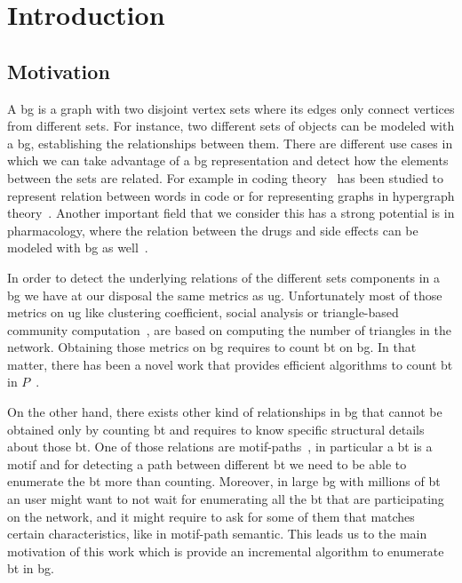 \chapter{Introduction}\label{chapter:1}
\section{Motivation}
A \acrfull{bg} is a graph with two disjoint vertex sets where its edges only connect vertices from different sets. 
For instance, two different sets of objects can be modeled with a \acrshort{bg}, establishing the relationships between them.
There are different use cases in which we can take advantage of a \acrshort{bg} representation and detect how the elements between the sets
are related. For example in coding theory~\cite{DBLP:journals/corr/WangL13} has been studied to represent relation between words in code 
or for representing graphs in hypergraph theory~\cite{hypergraph}. Another important field that we consider this has a strong potential is 
in pharmacology, where the relation between the drugs and side effects can be modeled with \acrshort{bg} as well~\cite{drugs}.

In order to detect the underlying relations of the different sets components in a \acrshort{bg} we have at our disposal the same metrics as \acrfull{ug}.
Unfortunately most of those metrics on \acrshort{ug} like clustering coefficient, social analysis or triangle-based community computation~\cite{ccoef,detect_graph,Newman_2003},
are based on computing the number of triangles in the network. Obtaining those metrics on \acrshort{bg} requires to count \acrfull{bt} on \acrshort{bg}.
In that matter, there has been a novel work that provides efficient algorithms to count \acrshort{bt} in $P$~\cite{btcount}.

On the other hand, there exists other kind of relationships in \acrshort{bg} that cannot be obtained only by counting \acrshort{bt} and requires to know specific
structural details about those \acrshort{bt}. One of those relations are motif-paths~\cite{Li2019MotifPA}, in particular a \acrshort{bt} is a motif and for detecting
a path between different \acrshort{bt} we need to be able to enumerate the \acrshort{bt} more than counting.
Moreover, in large \acrshort{bg} with millions of \acrshort{bt} an user might want to not wait for enumerating all the \acrshort{bt} that are participating on the network,
and it might require to ask for some of them that matches certain characteristics, like in motif-path semantic. This leads us to the main motivation of this work which is provide
an incremental algorithm to enumerate \acrlong{bt} in \acrlong{bg}.


